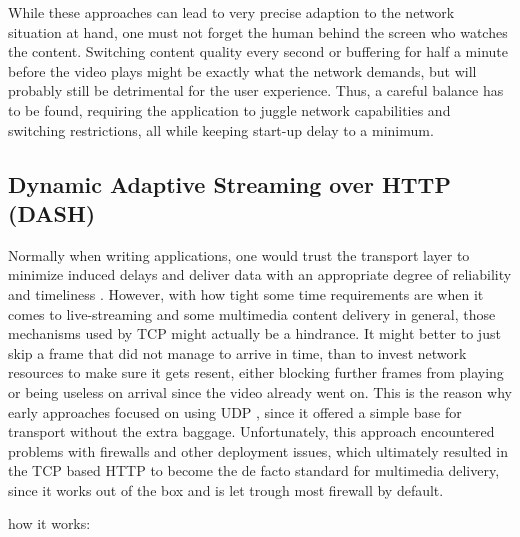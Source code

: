 While these approaches can lead to very precise adaption to the network situation at hand, one must not forget the human behind the screen who watches the content. Switching content quality every second or buffering for half a minute before the video plays might be exactly what the network demands, but will probably still be detrimental for the user experience. Thus, a careful balance has to be found, requiring the application to juggle network capabilities and switching restrictions, all while keeping start-up delay to a minimum.

\subsection{Dynamic Adaptive Streaming over HTTP (DASH)}

Normally when writing applications, one would trust the transport layer to minimize induced delays and deliver data with an appropriate degree of reliability and timeliness \cite{KuAB17}. However, with how tight some time requirements are when it comes to live-streaming and some multimedia content delivery in general, those mechanisms used by TCP \cite{Poot81} might actually be a hindrance. It might better to just skip a frame that did not manage to arrive in time, than to invest network resources to make sure it gets resent, either blocking further frames from playing or being useless on arrival since the video already went on. This is the reason why early approaches focused on using UDP \cite{Poot80}, since it offered a simple base for transport without the extra baggage. Unfortunately, this approach encountered problems with firewalls and other deployment issues, which ultimately resulted in the TCP based HTTP \cite{BePT15} to become the de facto standard for multimedia delivery, since it works out of the box and is let trough most firewall by default.


how it works:


